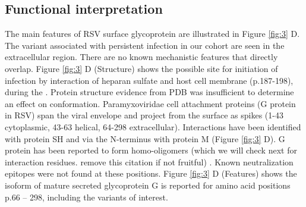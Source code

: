 \documentclass{article}
\begin{document}
\subsection{Functional interpretation}
The main features of RSV surface glycoprotein are illustrated in Figure \ref{fig:3} D.
The variant associated with persistent infection in our cohort are seen in the extracellular region. 
There are no known mechanistic features that directly overlap. 
Figure \ref{fig:3} D (Structure) shows the possible site for  initiation of infection by interaction of heparan sulfate and host cell membrane (p.187-198), during the  \cite{levine1987demonstration, feldman1999identification, feldman2000fusion}.
Protein structure evidence from PDB was insufficient to determine an effect on conformation. 
Paramyxoviridae cell attachment proteins (G protein in RSV) span the viral envelope and project from the surface as spikes 
(1-43 cytoplasmic, 43-63 helical, 64-298 extracellular).
Interactions  have been identified with protein SH 
\cite{rixon2005respiratory} 
and via the N-terminus with protein M 
\cite{ghildyal2005interaction} (Figure \ref{fig:3} D).
G protein has been reported to form homo-oligomers (which we will check next for interaction residues. remove this citation if not fruitful)
\cite{collins1992oligomerization}.
Known neutralization epitopes were not found at these positions.
Figure \ref{fig:3} D (Features) shows the isoform of mature secreted glycoprotein G is reported for amino acid positions p.66 – 298, including the variants of interest.
\end{document}
